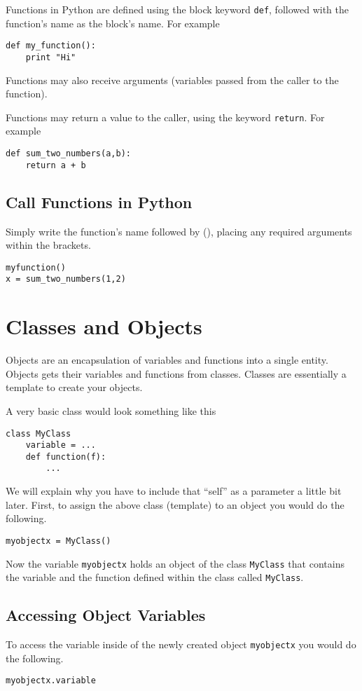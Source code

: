 \documentclass[a4paper,oneside]{book}
\numberwithin{equation}{chapter}
\begin{document}
Functions in Python are defined using the block keyword \texttt{def}, followed with the function's name as the block's name. For example
\begin{verbatim}
def my_function():
    print "Hi"
\end{verbatim}

Functions may also receive arguments (variables passed from the caller to the function).

Functions may return a value to the caller, using the keyword \texttt{return}. For example
\begin{verbatim}
def sum_two_numbers(a,b):
    return a + b 
\end{verbatim}
\subsection{Call Functions in Python}
Simply write the function's name followed by (), placing any required arguments within the brackets.
\begin{verbatim}
myfunction() 
x = sum_two_numbers(1,2)
\end{verbatim}
\section{Classes and Objects}
Objects are an encapsulation of variables and functions into a single entity. Objects gets their variables and functions from classes. Classes are essentially a template to create your objects.

A very basic class would look something like this
\begin{verbatim}
class MyClass
    variable = ...
    def function(f):
        ...
\end{verbatim}

We will explain why you have to include that ``self'' as a parameter a little bit later. First, to assign the above class (template) to an object you would do the following.
\begin{verbatim}
myobjectx = MyClass()
\end{verbatim}

Now the variable \texttt{myobjectx} holds an object of the class \texttt{MyClass} that contains the variable and the function defined within the class called \texttt{MyClass}.
\subsection{Accessing Object Variables}
To access the variable inside of the newly created object \texttt{myobjectx} you would do the following.
\begin{verbatim}
myobjectx.variable
\end{verbatim}
\end{document}
